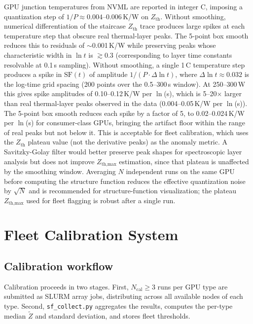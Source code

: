 \documentclass[conference]{IEEEtran}
\begin{document}
GPU junction temperatures from NVML are reported in integer
\textdegree C, imposing a quantization step of $1/P \approx
0.004$--0.006\,K/W on $Z_\text{th}$.
Without smoothing, numerical differentiation of the staircase
$Z_\text{th}$ trace produces large spikes at each temperature step
that obscure real thermal-layer peaks.
The 5-point box smooth reduces this to residuals of $\sim$0.001\,K/W
while preserving peaks whose characteristic width in $\ln t$ is
$\gtrsim 0.3$ (corresponding to layer time constants resolvable
at 0.1\,s sampling).
Without smoothing, a single 1\,\textdegree C temperature step
produces a spike in $\text{SF}(t)$ of amplitude $1/(P \cdot \Delta\ln t)$,
where $\Delta\ln t \approx 0.032$ is the log-time grid spacing (200
points over the 0.5--300\,s window).
At 250--300\,W this gives spike amplitudes of 0.10--0.12\,K/W per
$\ln$(s), which is 5--20$\times$ larger than real thermal-layer peaks
observed in the data (0.004--0.05\,K/W per $\ln$(s)).
The 5-point box smooth reduces each spike by a factor of 5, to
0.02--0.024\,K/W per $\ln$(s) for consumer-class GPUs, bringing the
artifact floor within the range of real peaks but not below it.
This is acceptable for fleet calibration, which uses the $Z_\text{th}$
plateau value (not the derivative peaks) as the anomaly metric.
A Savitzky-Golay filter would better preserve peak shapes for
spectroscopic layer analysis but does not improve $Z_\text{th,max}$
estimation, since that plateau is unaffected by the smoothing window.
Averaging $N$ independent runs on the same GPU before computing the
structure function reduces the effective quantization noise by $\sqrt{N}$
and is recommended for structure-function visualization; the plateau
$Z_\text{th,max}$ used for fleet flagging is robust after a single run.

\section{Fleet Calibration System}
\label{sec:system}

\subsection{Calibration workflow}

Calibration proceeds in two stages.
First, $N_\text{cal} \geq 3$ runs per GPU type are submitted as SLURM
array jobs, distributing across all available nodes of each type.
Second, \texttt{sf\_collect.py} aggregates the results, computes
the per-type median $\tilde{Z}$ and standard deviation, and stores
fleet thresholds.
\end{document}
